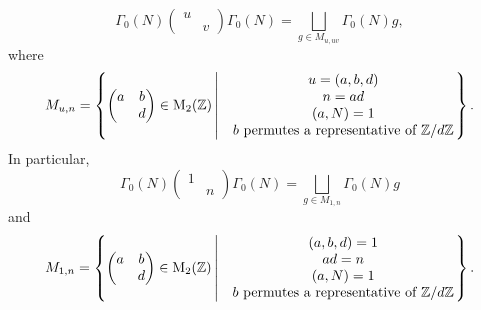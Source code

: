 \begin{proposition}
    \[\Gamma_0(N)\begin{pmatrix}
        u & \\ & v
    \end{pmatrix}\Gamma_0(N) = \bigsqcup_{g\in M_{u, uv}}\Gamma_0(N)g,\]
    where \[M_{u, n} = \left\{
        \begin{pmatrix}
            a & b \\ & d
        \end{pmatrix}\in \mathrm{M}_2(\mathbb{Z})\left|
        \begin{matrix}
            &u = (a, b, d)\\ 
            &n = ad\\
            &(a, N) = 1\\
            &b \text{ permutes a representative of } \mathbb{Z}/d\mathbb{Z}
        \end{matrix}
        \right.
    \right\}.\]
    In particular,\[\Gamma_0(N)\begin{pmatrix}
        1 & \\ & n
    \end{pmatrix}\Gamma_0(N) = \bigsqcup_{g\in M_{1, n}}\Gamma_0(N)g\]
    and \[M_{1, n} = \left\{
        \begin{pmatrix}
            a & b \\ & d
        \end{pmatrix}\in \mathrm{M}_2(\mathbb{Z})\left|
        \begin{matrix}
            &(a, b, d) = 1\\ 
            &ad = n\\
            &(a, N) = 1\\
            &b \text{ permutes a representative of } \mathbb{Z}/d\mathbb{Z}
        \end{matrix}
        \right.
    \right\}. \]


\end{proposition}

